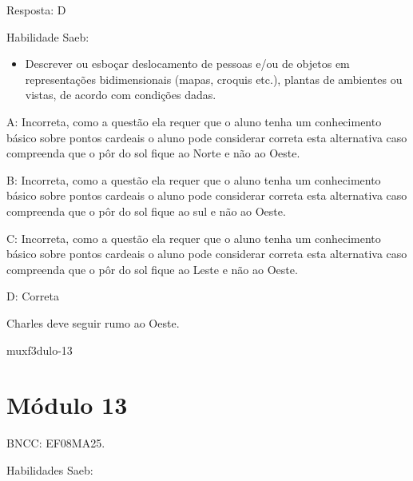 {Resposta: D

Habilidade Saeb:

\begin{itemize}
\tightlist
\item
  Descrever ou esboçar deslocamento de pessoas e/ou de objetos em
  representações bidimensionais (mapas, croquis etc.), plantas de
  ambientes ou vistas, de acordo com condições dadas.
\end{itemize}

A: Incorreta, como a questão ela requer que o aluno tenha um
conhecimento básico sobre pontos cardeais o aluno pode considerar
correta esta alternativa caso compreenda que o pôr do sol fique ao Norte
e não ao Oeste.

B: Incorreta, como a questão ela requer que o aluno tenha um
conhecimento básico sobre pontos cardeais o aluno pode considerar
correta esta alternativa caso compreenda que o pôr do sol fique ao sul e
não ao Oeste.

C: Incorreta, como a questão ela requer que o aluno tenha um
conhecimento básico sobre pontos cardeais o aluno pode considerar
correta esta alternativa caso compreenda que o pôr do sol fique ao Leste
e não ao Oeste.

D: Correta

Charles deve seguir rumo ao Oeste.

muxf3dulo-13}{%
\section{Módulo 13}

BNCC: EF08MA25.

Habilidades Saeb:

}
